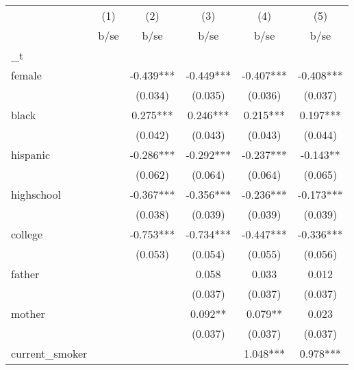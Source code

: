 {
\def\sym#1{\ifmmode^{#1}\else\(^{#1}\)\fi}
\begin{tabular}{l*{5}{c}}
\hline\hline
                &\multicolumn{1}{c}{(1)}&\multicolumn{1}{c}{(2)}&\multicolumn{1}{c}{(3)}&\multicolumn{1}{c}{(4)}&\multicolumn{1}{c}{(5)}\\
                &        b/se   &        b/se   &        b/se   &        b/se   &        b/se   \\
\hline
\_t              &               &               &               &               &               \\
female          &               &      -0.439***&      -0.449***&      -0.407***&      -0.408***\\
                &               &     (0.034)   &     (0.035)   &     (0.036)   &     (0.037)   \\
black           &               &       0.275***&       0.246***&       0.215***&       0.197***\\
                &               &     (0.042)   &     (0.043)   &     (0.043)   &     (0.044)   \\
hispanic        &               &      -0.286***&      -0.292***&      -0.237***&      -0.143** \\
                &               &     (0.062)   &     (0.064)   &     (0.064)   &     (0.065)   \\
highschool      &               &      -0.367***&      -0.356***&      -0.236***&      -0.173***\\
                &               &     (0.038)   &     (0.039)   &     (0.039)   &     (0.039)   \\
college         &               &      -0.753***&      -0.734***&      -0.447***&      -0.336***\\
                &               &     (0.053)   &     (0.054)   &     (0.055)   &     (0.056)   \\
father          &               &               &       0.058   &       0.033   &       0.012   \\
                &               &               &     (0.037)   &     (0.037)   &     (0.037)   \\
mother          &               &               &       0.092** &       0.079** &       0.023   \\
                &               &               &     (0.037)   &     (0.037)   &     (0.037)   \\
current\_smoker  &               &               &               &       1.048***&       0.978***\\

\end{tabular}}
